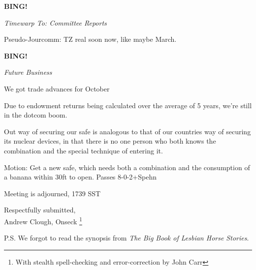 \documentclass{article}
\begin{document}
\textbf{BING!}
\begin{center}
\textit{Timewarp To: Committee Reports}
\end{center}

Pseudo-Jourcomm: TZ real soon now, like maybe March.


\textbf{BING!}
\begin{center}
\textit{Future Business}
\end{center}

We got trade advances for October

Due to endowment returns being calculated over the average of 5 years, we're still in the dotcom boom.  

Out way of securing our safe is analogous to that of our countries way of securing its nuclear devices, in that there is no one person who both knows the combination and the special technique of entering it.

Motion:  Get a new safe, which needs both a combination and the consumption of a banana within 30ft to open.  Passes 8-0-2+Spehn

Meeting is adjourned, 1739 SST



\begin{center}
Respectfully submitted,\\
Andrew Clough, Onseck
\footnote{With stealth spell-checking and error-correction by John Carr}
\end{center}

P.S.  We forgot to read the synopsis from {\em The Big Book of Lesbian Horse Stories}.
\end{document}
